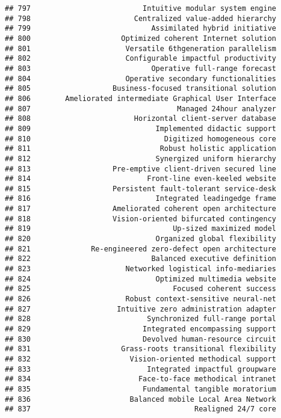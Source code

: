 \documentclass[
]{article}
\begin{document}
\begin{verbatim}
## 797                          Intuitive modular system engine
## 798                        Centralized value-added hierarchy
## 799                            Assimilated hybrid initiative
## 800                     Optimized coherent Internet solution
## 801                      Versatile 6thgeneration parallelism
## 802                      Configurable impactful productivity
## 803                            Operative full-range forecast
## 804                      Operative secondary functionalities
## 805                   Business-focused transitional solution
## 806        Ameliorated intermediate Graphical User Interface
## 807                                  Managed 24hour analyzer
## 808                        Horizontal client-server database
## 809                             Implemented didactic support
## 810                               Digitized homogeneous core
## 811                              Robust holistic application
## 812                             Synergized uniform hierarchy
## 813                   Pre-emptive client-driven secured line
## 814                           Front-line even-keeled website
## 815                   Persistent fault-tolerant service-desk
## 816                             Integrated leadingedge frame
## 817                   Ameliorated coherent open architecture
## 818                   Vision-oriented bifurcated contingency
## 819                                 Up-sized maximized model
## 820                             Organized global flexibility
## 821              Re-engineered zero-defect open architecture
## 822                            Balanced executive definition
## 823                      Networked logistical info-mediaries
## 824                             Optimized multimedia website
## 825                                 Focused coherent success
## 826                      Robust context-sensitive neural-net
## 827                    Intuitive zero administration adapter
## 828                           Synchronized full-range portal
## 829                          Integrated encompassing support
## 830                          Devolved human-resource circuit
## 831                     Grass-roots transitional flexibility
## 832                       Vision-oriented methodical support
## 833                           Integrated impactful groupware
## 834                         Face-to-face methodical intranet
## 835                          Fundamental tangible moratorium
## 836                       Balanced mobile Local Area Network
## 837                                      Realigned 24/7 core

\end{verbatim}
\end{document}
